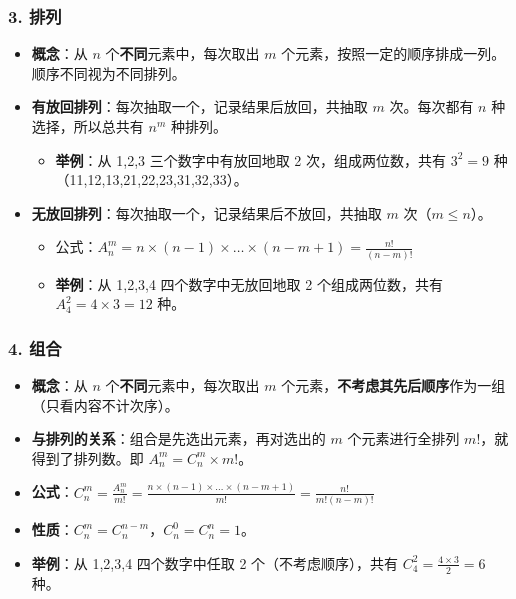 \documentclass[12pt,a4paper]{ctexart}
\begin{document}
\subsubsection{3. 排列}
\begin{itemize}[noitemsep]
    \item \textbf{概念}：从 $n$ 个\textbf{不同}元素中，每次取出 $m$ 个元素，按照一定的顺序排成一列。顺序不同视为不同排列。
    \item \textbf{有放回排列}：每次抽取一个，记录结果后放回，共抽取 $m$ 次。每次都有 $n$ 种选择，所以总共有 $n^m$ 种排列。
          \begin{itemize}[noitemsep]
              \item \textbf{举例}：从 1,2,3 三个数字中有放回地取 2 次，组成两位数，共有 $3^2=9$ 种（11,12,13,21,22,23,31,32,33）。
          \end{itemize}
    \item \textbf{无放回排列}：每次抽取一个，记录结果后不放回，共抽取 $m$ 次（$m \le n$）。
          \begin{itemize}[noitemsep]
              \item 公式：$\displaystyle A_n^m = n \times (n-1) \times \dots \times (n-m+1) = \frac{n!}{(n-m)!}$
              \item \textbf{举例}：从 1,2,3,4 四个数字中无放回地取 2 个组成两位数，共有 $A_4^2 = 4 \times 3 = 12$ 种。
          \end{itemize}
\end{itemize}

\subsubsection{4. 组合}
\begin{itemize}[noitemsep]
    \item \textbf{概念}：从 $n$ 个\textbf{不同}元素中，每次取出 $m$ 个元素，\textbf{不考虑其先后顺序}作为一组（只看内容不计次序）。
    \item \textbf{与排列的关系}：组合是先选出元素，再对选出的 $m$ 个元素进行全排列 $m!$，就得到了排列数。即 $A_n^m = C_n^m \times m!$。
    \item \textbf{公式}：$\displaystyle C_n^m = \frac{A_n^m}{m!} = \frac{n \times (n-1) \times \dots \times (n-m+1)}{m!} = \frac{n!}{m!(n-m)!}$
    \item \textbf{性质}：$C_n^m = C_n^{n-m}$，$C_n^0 = C_n^n = 1$。
    \item \textbf{举例}：从 1,2,3,4 四个数字中任取 2 个（不考虑顺序），共有 $C_4^2 = \frac{4 \times 3}{2} = 6$ 种。
\end{itemize}
\end{document}
